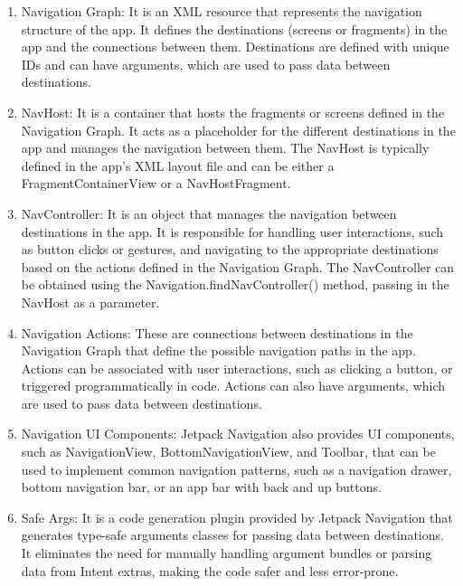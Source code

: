 \documentclass[a4paper, 12pt]{article}
\begin{document}
\begin{enumerate}
    \item Navigation Graph: It is an XML resource that represents the navigation structure of the app. It defines the destinations (screens or fragments) in the app and the connections between them. 
    Destinations are defined with unique IDs and can have arguments, which are used to pass data between destinations. \textit{\texttt{}} 

    \item NavHost: It is a container that hosts the fragments or screens defined in the Navigation Graph.
     It acts as a placeholder for the different destinations in the app and manages the navigation between them. 
     The NavHost is typically defined in the app's XML layout file and can be either a FragmentContainerView or a NavHostFragment.
     \textit{\texttt{}} 
    
    \item NavController: It is an object that manages the navigation between destinations in the app.
     It is responsible for handling user interactions, such as button clicks or gestures, 
     and navigating to the appropriate destinations based on the actions defined in the Navigation Graph.
    The NavController can be obtained using the Navigation.findNavController() method, passing in the NavHost as a parameter.

    \item Navigation Actions: These are connections between destinations in the Navigation Graph that define the possible navigation paths in the app. 
    Actions can be associated with user interactions, such as clicking a button, or triggered programmatically in code. 
    Actions can also have arguments, which are used to pass data between destinations.
    
    \item Navigation UI Components: Jetpack Navigation also provides UI components, such as NavigationView, BottomNavigationView, and Toolbar, that can be used to implement common navigation patterns, 
    such as a navigation drawer, bottom navigation bar, or an app bar with back and up buttons.
    \textit{\texttt{}} 
    
    \item Safe Args: It is a code generation plugin provided by Jetpack Navigation that generates type-safe arguments classes for passing data between destinations.
     It eliminates the need for manually handling argument bundles or parsing data from Intent extras, making the code safer and less error-prone.
    
\end{enumerate}
\end{document}
